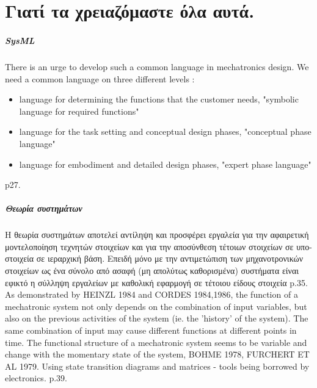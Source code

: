 \documentclass[a4paper,12pt,twoside]{report}
\begin{document}
{	\chapter{Γιατί τα χρειαζόμαστε όλα αυτά.}
		\label{κεφ.:Γιατί τα χρειαζόμαστε όλα αυτά.}
		
		\paragraph{SysML}{There is an urge to develop such a common language in mechatronics design. We need a common language on three different levels :
		\begin{itemize}
			\item language for determining the functions that the customer needs, "symbolic language for required functions"
			\item language for the task setting and conceptual design phases, "conceptual phase language"
			\item language for embodiment and detailed design phases, "expert phase language"
			\end{itemize}
			\cite{ATheoreticalApproachOnMechatronicsDesign:Buur1990} p27.
		}
		
		\paragraph{Θεωρία συστημάτων}{Η θεωρία συστημάτων αποτελεί αντίληψη και προσφέρει εργαλεία για την αφαιρετική μοντελοποίηση τεχνητών στοιχείων και για την αποσύνθεση τέτοιων στοιχείων σε υπο-στοιχεία σε ιεραρχική βάση. Επειδή μόνο με την αντιμετώπιση των μηχανοτρονικών στοιχείων ως ένα σύνολο από ασαφή (μη απολύτως καθορισμένα) συστήματα είναι εφικτό η σύλληψη εργαλείων με καθολική εφαρμογή σε τέτοιου είδους στοιχεία \cite{ATheoreticalApproachOnMechatronicsDesign:Buur1990} p.35.
		\linebreak
		As demonstrated by HEINZL 1984 and CORDES 1984,1986, the function of a mechatronic system not only depends on the combination of input variables, but also on the previous activities of the system (ie. the 'history' of the system). The same combination of input may cause different functions at different points in time. The functional structure of a mechatronic system seems to be variable and change with the momentary state of the system, BOHME 1978, FURCHERT ET AL 1979. Using state transition diagrams and matrices - tools being borrowed by electronics. \cite{ATheoreticalApproachOnMechatronicsDesign:Buur1990} p.39.
		}

}
\end{document}
